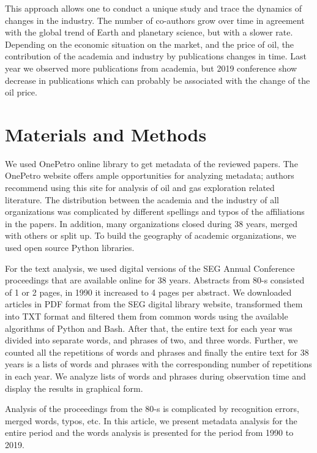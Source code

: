 \documentclass[geosciences,article,submit,moreauthors,pdftex]{Definitions/mdpi}
\begin{document}
This approach allows one to conduct a unique study and trace the dynamics of changes in the industry. The number of co-authors grow over time in agreement with the global trend of Earth and planetary science, but with a slower rate. Depending on the economic situation on the market, and the price of oil, the contribution of the academia and industry by publications changes in time. Last year we observed more publications from academia, but 2019 conference show decrease in publications which can probably be associated with the change of the oil price. %

\section{Materials and Methods}

We used OnePetro online library \citep{SPE2019} to get metadata of the reviewed papers. The OnePetro website offers ample opportunities for analyzing metadata; authors recommend using this site for analysis of oil and gas exploration related literature. The distribution between the academia and the industry of all organizations was complicated by different spellings and typos of the affiliations in the papers. In addition, many organizations closed during 38 years, merged with others or split up. To build the geography of academic organizations, we used open source Python libraries.

For the text analysis, we used digital versions of the SEG Annual Conference proceedings that are available online for 38 years. Abstracts from 80-s  consisted of 1 or 2 pages, in 1990 it increased to 4 pages per abstract. We downloaded articles in PDF format from the SEG digital library website, transformed them into TXT format and filtered them from common words using the available algorithms of Python and Bash. After that, the entire text for each year was divided into separate words, and phrases of two, and three words. Further, we counted all the repetitions of words and phrases and finally the entire text for 38 years is a lists of words and phrases with the corresponding number of repetitions in each year. We analyze lists of words and phrases during observation time and display the results in graphical form.

Analysis of the proceedings from the 80-s is complicated by recognition errors, merged words, typos, etc. In this article, we present metadata analysis for the entire period and the words analysis is presented for the period from 1990 to 2019. 
\end{document}
